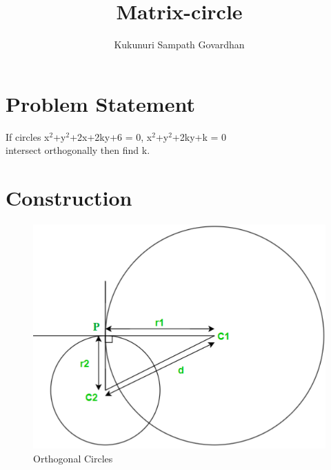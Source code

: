 \documentclass[journal,12pt,twocolumn]{IEEEtran}
\title{
Matrix-circle
}
\author{Kukunuri Sampath Govardhan}
\begin{document}
\maketitle
\tableofcontents
\section{Problem Statement}
\begin{flushleft}
    If circles x$^2$+y$^2$+2x+2ky+6 = 0,  x$^2$+y$^2$+2ky+k = 0\\
intersect orthogonally then find k.\\
\end{flushleft}
\section{Construction}
\begin{figure}[h]
    \centering
\includegraphics[width=\columnwidth]{figs/Assignment5.png}
    \caption{Orthogonal Circles}
    \label{fig:my_label}
\end{figure}
\vspace{2cm}
\end{document}
